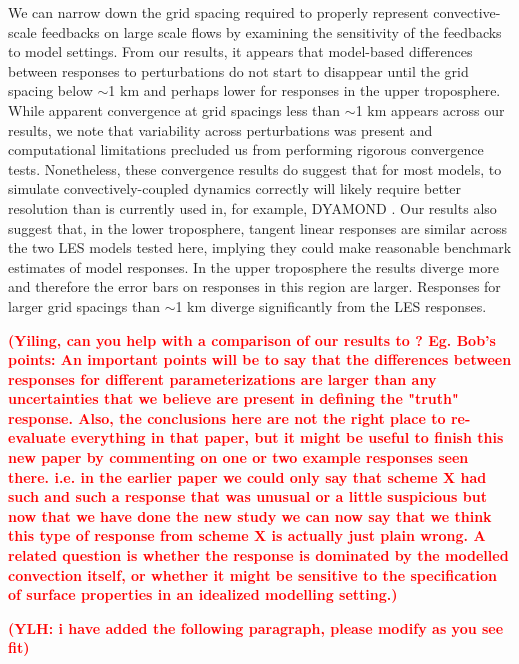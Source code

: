 \documentclass[draft]{agujournal2019}
\newcommand{\todo}[1]{\textcolor{red}{\textbf{(#1)}}}
\begin{document}
We can narrow down the grid spacing required to properly represent
convective-scale feedbacks on large scale flows by examining the sensitivity of
the feedbacks to model settings. From our results, it appears that model-based
differences between responses to perturbations do not start to disappear until
the grid spacing below $\sim$1 km and perhaps lower for responses in the upper
troposphere. While apparent convergence at grid spacings less than $\sim$1 km
appears across our results, we note that variability across perturbations was
present and computational limitations precluded us from performing rigorous
convergence tests. Nonetheless, these convergence results do suggest that for
most models, to simulate convectively-coupled dynamics correctly will likely
require better resolution than is currently used in, for example, DYAMOND
\cite{Stevens_PEPS_2019}. Our results also suggest that, in the lower
troposphere, tangent linear responses are similar across the two LES models
tested here, implying they could make reasonable benchmark estimates of model
responses. In the upper troposphere the results diverge more and therefore the
error bars on responses in this region are larger. Responses for larger grid
spacings than $\sim$1 km diverge significantly from the LES responses.

\todo{Yiling, can you help with a comparison of our results to
\citeA{Hwong_JAMES_2021}? Eg. Bob's points: An important points will be to say
that the differences between responses for different parameterizations are
larger than any uncertainties that we believe are present in defining the
"truth" response. Also, the conclusions here are not the right place to
re-evaluate everything in that paper, but it might be useful to finish this new
paper by commenting on one or two example responses seen there. i.e. in the
earlier paper we could only say that scheme X had such and such a response that
was unusual or a little suspicious but now that we have done the new study we
can now say that we think this type of response from scheme X is actually just
plain wrong. A related question is whether the response is dominated by the
modelled convection itself, or whether it might be sensitive to the
specification of surface properties in an idealized modelling setting.}

\todo{YLH: i have added the following paragraph, please modify as you see fit}
\end{document}
